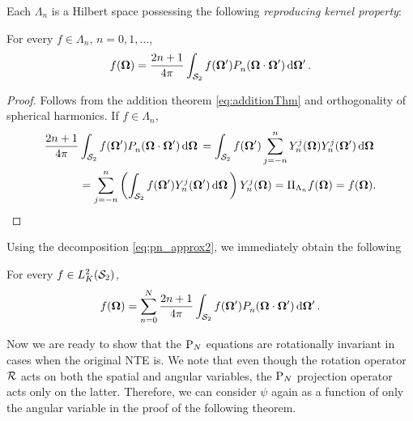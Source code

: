 Each $\Lambda_n$ is a Hilbert space possessing the following \textit{reproducing kernel property}:
\begin{lemma}
	For every $f \in \Lambda_n$, $n = 0,1,\ldots$, 
	$$
		f(\bomega) = \frac{2n+1}{4\pi} \intA[']{f(\bomega')\P{n}{}(\bomega\cdot\bomega')}.
	$$
\end{lemma}
\begin{proof}
	Follows from the addition theorem \eqref{eq:additionThm} and orthogonality of spherical harmonics. If $f \in
	\Lambda_n$,
	$$
		\begin{aligned}
			\frac{2n+1}{4\pi}&\intA{f(\bomega')\P{n}{}(\bomega\cdot\bomega')} = 
			\intA{f(\bomega')\sum_{j=-n}^{n}\Y{n}{j}(\bomega)\Y{n}{j}(\bomega')} \\
			&= \sum_{j=-n}^{n}\left(\intA{f(\bomega')\Y{n}{j}(\bomega')}\right)\Y{n}{j}(\bomega) =
			\Projop[\Lambda_n]f(\bomega) = f(\bomega).
		\end{aligned}
	$$
\end{proof}
\noindent Using the decomposition \eqref{eq:pn_approx2}, we immediately obtain the following
\begin{corollary}\label{cor:repker}
	For every $f\in\Lp[2]_K(\Sphere)$,
	\begin{equation}\label{eq:repker}
		f(\bomega) = \sum_{n=0}^{N} \frac{2n+1}{4\pi} \intA[']{f(\bomega')\P{n}{}(\bomega\cdot\bomega')}.
	\end{equation} 
\end{corollary}
%
\noindent Now we are ready to show that the $\PN$ equations are rotationally
invariant in cases when the original NTE is. We note that even though the rotation operator $\genop{R}$ acts on both the
spatial and angular variables, the $\PN$ projection operator acts only on the latter. Therefore, we can consider $\psi$
again as a function of only the angular variable in the proof of the following theorem.

